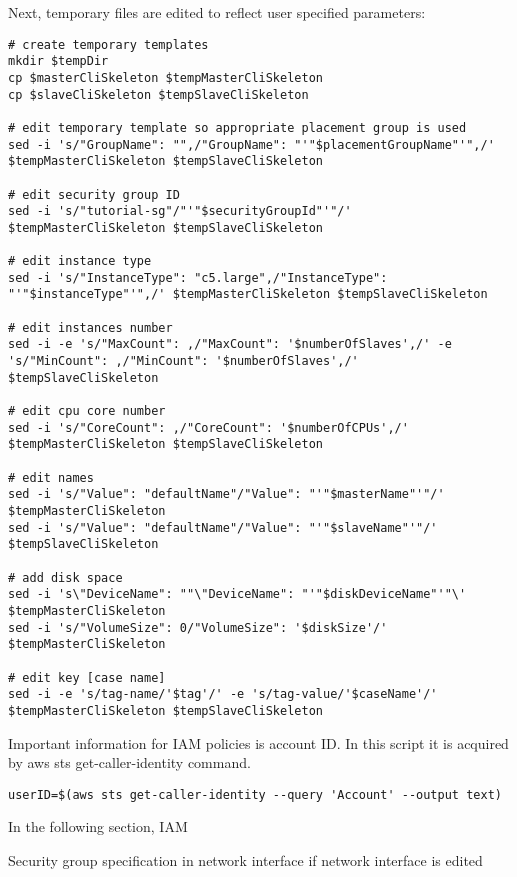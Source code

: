 \documentclass[12pt,english]{article}
\begin{document}
Next, temporary files are edited to reflect user specified parameters:
\begin{lstlisting}
# create temporary templates
mkdir $tempDir
cp $masterCliSkeleton $tempMasterCliSkeleton
cp $slaveCliSkeleton $tempSlaveCliSkeleton

# edit temporary template so appropriate placement group is used
sed -i 's/"GroupName": "",/"GroupName": "'"$placementGroupName"'",/' $tempMasterCliSkeleton $tempSlaveCliSkeleton

# edit security group ID
sed -i 's/"tutorial-sg"/"'"$securityGroupId"'"/' $tempMasterCliSkeleton $tempSlaveCliSkeleton

# edit instance type
sed -i 's/"InstanceType": "c5.large",/"InstanceType": "'"$instanceType"'",/' $tempMasterCliSkeleton $tempSlaveCliSkeleton

# edit instances number
sed -i -e 's/"MaxCount": ,/"MaxCount": '$numberOfSlaves',/' -e 's/"MinCount": ,/"MinCount": '$numberOfSlaves',/' $tempSlaveCliSkeleton

# edit cpu core number
sed -i 's/"CoreCount": ,/"CoreCount": '$numberOfCPUs',/' $tempMasterCliSkeleton $tempSlaveCliSkeleton

# edit names
sed -i 's/"Value": "defaultName"/"Value": "'"$masterName"'"/' $tempMasterCliSkeleton
sed -i 's/"Value": "defaultName"/"Value": "'"$slaveName"'"/' $tempSlaveCliSkeleton

# add disk space
sed -i 's\"DeviceName": ""\"DeviceName": "'"$diskDeviceName"'"\' $tempMasterCliSkeleton
sed -i 's/"VolumeSize": 0/"VolumeSize": '$diskSize'/' $tempMasterCliSkeleton

# edit key [case name]
sed -i -e 's/tag-name/'$tag'/' -e 's/tag-value/'$caseName'/' $tempMasterCliSkeleton $tempSlaveCliSkeleton
\end{lstlisting}
Important information for IAM policies is account ID. In this script it is acquired by aws sts get-caller-identity command.
\begin{lstlisting}
userID=$(aws sts get-caller-identity --query 'Account' --output text)
\end{lstlisting}
In the following section, IAM 


Security group specification in network interface if network interface is edited
\end{document}
